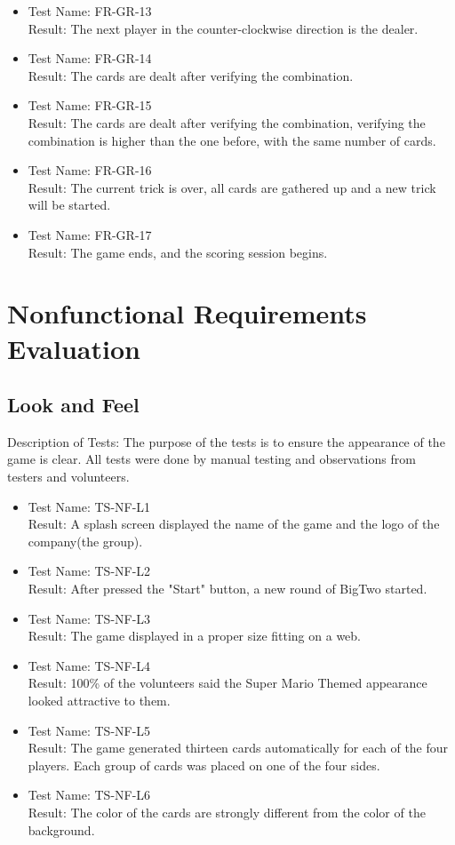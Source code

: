 \documentclass[12pt, titlepage]{article}
\begin{document}
\begin{itemize}
\item[]
Test Name: FR-GR-13\\
Result: The next player in the counter-clockwise direction is the dealer.
\item[]
Test Name: FR-GR-14\\
Result: The cards are dealt after verifying the combination.
\item[]
Test Name: FR-GR-15\\
Result: The cards are dealt after verifying the combination, verifying the combination is higher than the one before, with the same number of cards.
\item[]
Test Name: FR-GR-16\\
Result: The current trick is over, all cards are gathered up and a new trick will be started.
\item[]
Test Name: FR-GR-17\\
Result: The game ends, and the scoring session begins.


\end{itemize}
\section{Nonfunctional Requirements Evaluation}

\subsection{Look and Feel}
Description of Tests: The purpose of the tests is to ensure the appearance of the game is clear. All tests were done by manual testing and observations from testers and volunteers.

\begin{itemize}
\item[]
Test Name: TS-NF-L1\\
Result: A splash screen displayed the name of the game and the logo of the company(the group).

\item[]
Test Name: TS-NF-L2\\
Result: After pressed the "Start" button, a new round of BigTwo started.

\item[]
Test Name: TS-NF-L3\\
Result: The game displayed in a proper size fitting on a web.

\item[]
Test Name: TS-NF-L4\\
Result: 100\% of the volunteers said the Super Mario Themed appearance looked attractive to them.

\item[]
Test Name: TS-NF-L5\\
Result: The game generated thirteen cards automatically for each of the four players. Each group of cards was placed on one of the four sides.

\item[]
Test Name: TS-NF-L6\\
Result: The color of the cards are strongly different from the color of the background.

\end{itemize}
\end{document}
